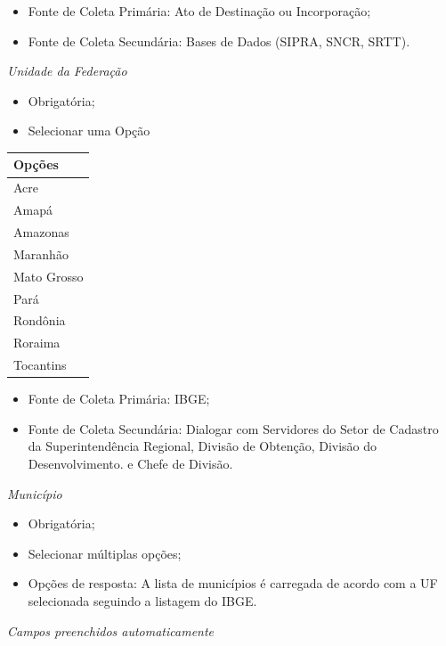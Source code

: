 \documentclass[
  letterpaper,
]{report}
\providecommand{\tightlist}{%
  \setlength{\itemsep}{0pt}\setlength{\parskip}{0pt}}\usepackage{longtable,booktabs,array}
\begin{document}
\begin{itemize}
\tightlist
\item
  Fonte de Coleta Primária: Ato de Destinação ou Incorporação;
\item
  Fonte de Coleta Secundária: Bases de Dados (SIPRA, SNCR, SRTT).
\end{itemize}

\emph{Unidade da Federação}

\begin{itemize}
\tightlist
\item
  Obrigatória;
\item
  Selecionar uma Opção
\end{itemize}

\begin{longtable}[]{@{}l@{}}
\toprule()
Opções \\
\midrule()
\endhead
Acre \\
Amapá \\
Amazonas \\
Maranhão \\
Mato Grosso \\
Pará \\
Rondônia \\
Roraima \\
Tocantins \\
\bottomrule()
\end{longtable}

\begin{itemize}
\tightlist
\item
  Fonte de Coleta Primária: IBGE;
\item
  Fonte de Coleta Secundária: Dialogar com Servidores do Setor de
  Cadastro da Superintendência Regional, Divisão de Obtenção, Divisão do
  Desenvolvimento. e Chefe de Divisão.
\end{itemize}

\emph{Município}

\begin{itemize}
\tightlist
\item
  Obrigatória;
\item
  Selecionar múltiplas opções;
\item
  Opções de resposta: A lista de municípios é carregada de acordo com a
  UF selecionada seguindo a listagem do IBGE.
\end{itemize}

\emph{Campos preenchidos automaticamente}
\end{document}
